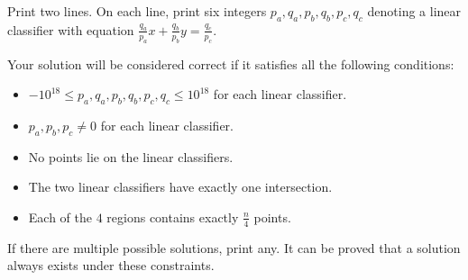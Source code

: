 Print two lines.
On each line, print six integers $p_a,q_a,p_b,q_b,p_c,q_c$ denoting a linear classifier with equation $\frac{q_a}{p_a} x + \frac{q_b}{p_b} y = \frac{q_c}{p_c}$. 

Your solution will be considered correct if it satisfies all the following conditions:
\begin{itemize}
\item $-10^{18} \leq p_a,q_a,p_b,q_b,p_c,q_c \leq 10^{18}$ for each linear classifier.
\item $p_a,p_b,p_c \neq 0$ for each linear classifier.
\item No points lie on the linear classifiers.
\item The two linear classifiers have exactly one intersection.
\item Each of the $4$ regions contains exactly $\frac{n}{4}$ points.
\end{itemize}
If there are multiple possible solutions, print any. It can be proved that a solution always exists under these constraints.